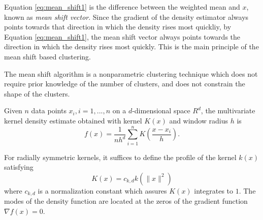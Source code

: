 Equation \eqref{eq:mean_shift1} is the difference between the weighted mean and
$x$, known as \emph{mean shift vector}. Since the gradient of the density estimator always points towards that direction in which the density rises most quickliy, by Equation \eqref{eq:mean_shift1}, the mean shift vector always points towards the direction in which the density rises most quickly. This is the main principle of the mean shift based clustering. 



The mean shift algorithm is a nonparametric clustering technique which does not
require prior knowledge of the number of clusters, and does not constrain the
shape of the clusters. 

Given $n$ data points $x_i, i = 1, ... , n$ on a
$d$-dimensional space $R^d$, the multivariate kernel density estimate obtained
with kernel $K(x)$ and window radius $h$ is
\begin{equation}\label{density_estimator}
	f(x)=\frac{1}{nh^d}\sum_{i=1}^n K(\frac{x-x_i}{h}).
\end{equation}

For radially symmetric kernels, it suffices to define the profile of the kernel
$k(x)$ satisfying
\begin{equation}
	K(x)=c_{k,d}k(\lVert x \rVert^2)
\end{equation}
where $c_{k,d}$ is a normalization constant which assures $K(x)$ integrates to 
$1$. The modes of the density function are located at the zeros of the gradient
function  $\nabla f(x) = 0$.

